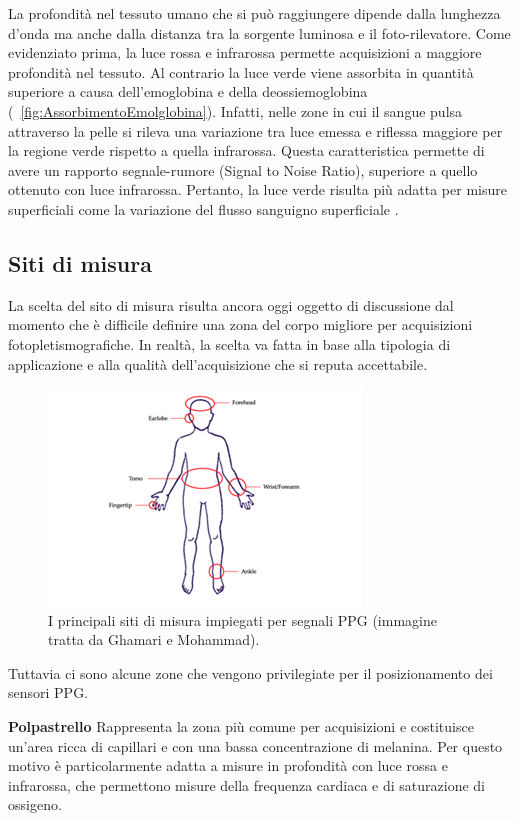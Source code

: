 La profondità nel tessuto umano che si può raggiungere dipende dalla lunghezza d'onda ma anche dalla distanza tra la sorgente luminosa e il foto-rilevatore. Come evidenziato prima, la luce rossa e infrarossa permette acquisizioni a maggiore profondità nel tessuto. Al contrario la luce verde viene assorbita in quantità superiore\cite{Lee2021} a causa dell'emoglobina e della deossiemoglobina (\Fig~\ref{fig:AssorbimentoEmolglobina}). Infatti, nelle zone in cui il sangue pulsa attraverso la pelle si rileva una variazione tra luce emessa e riflessa maggiore per la regione verde rispetto a quella infrarossa. Questa caratteristica permette di avere un rapporto segnale-rumore (Signal to Noise Ratio), superiore a quello ottenuto con luce infrarossa. Pertanto, la luce verde risulta più adatta per misure superficiali come la variazione del flusso sanguigno superficiale \cite{Youssef2020}.

\clearpage

\subsection{Siti di misura}
La scelta del sito di misura risulta ancora oggi oggetto di discussione dal momento che è difficile definire una zona del corpo migliore per acquisizioni fotopletismografiche. In realtà, la scelta va fatta in base alla tipologia di applicazione e alla qualità dell'acquisizione che si reputa accettabile.
\begin{figure}[b]
	\centering
	\includegraphics[width=0.6\linewidth]{ImageFiles/Fotopletismografia/ZoneAcquisizione}
	\caption{I principali siti di misura impiegati per segnali PPG (immagine tratta da Ghamari e Mohammad\cite{Ghamari2018}).}
	\label{fig:ZoneAcquisizione}
\end{figure}
Tuttavia ci sono alcune zone che vengono privilegiate per il posizionamento dei sensori PPG.

\textbf{Polpastrello} Rappresenta la zona più comune per acquisizioni e costituisce un'area ricca di capillari e con una bassa concentrazione di melanina. Per questo motivo è particolarmente adatta a misure in profondità con luce rossa e infrarossa, che permettono misure della frequenza cardiaca e di saturazione di ossigeno.

